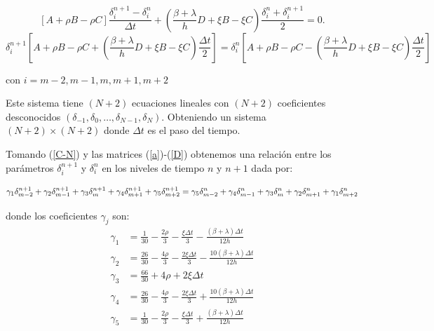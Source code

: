 $$[A+\rho B - \rho C]\frac{\delta_{i}^{n+1}-\delta_{i}^{n}}{\Delta t}+(\frac{\beta+\lambda}{h}D+\xi B-\xi C)\frac{\delta_{i}^{n}+\delta_{i}^{n+1}}{2}=0.$$
\begin{equation}
\label{C-N}
    \delta^{n+1}_{i}[A+\rho B - \rho C+(\frac{\beta+\lambda}{h}D+\xi B -\xi C)\frac{\Delta t}{2}]=\delta^{n}_{i}[A+\rho B - \rho C-(\frac{\beta+\lambda}{h}D+\xi B - \xi C)\frac{\Delta t}{2}]
\end{equation}

\noindent con $i=m-2,m-1,m,m+1,m+2$

Este sistema tiene $(N+2)$ ecuaciones lineales con $(N+2)$ coeficientes desconocidos $(\delta_{-1},\delta_{0},\dots,\delta_{N-1},\delta_{N})$. 
Obteniendo un sistema $(N+2)\times (N+2)$ donde $\Delta t$ es el paso del tiempo.

Tomando (\ref{C-N}) y las matrices (\ref{a})-(\ref{D}) obtenemos una relación entre los parámetros $\delta_{i}^{n+1}$ y $\delta_{i}^{n}$ en los niveles de tiempo $n$ y $n+1$ dada por:

\begin{equation}
\label{gammaec}
   \small{\gamma_{1}\delta_{m-2}^{n+1}+\gamma_{2}\delta_{m-1}^{n+1}+\gamma_{3}\delta_{m}^{n+1}+\gamma_{4}\delta_{m+1}^{n+1}+\gamma_{5}\delta_{m+2}^{n+1}=\\
   \centering
   \gamma_{5}\delta_{m-2}^{n}+\gamma_{4}\delta_{m-1}^{n}+\gamma_{3}\delta_{m}^{n}+\gamma_{2}\delta_{m+1}^{n}+\gamma_{1}\delta_{m+2}^{n}}
\end{equation}


\noindent donde los coeficientes $\gamma_{j}$ son:
\begin{align*}
   \gamma_{1} &=\frac{1}{30}-\frac{2\rho}{3}-\frac{\xi \Delta t}{3}-\frac{(\beta+\lambda)\Delta t}{12h}\\
    \gamma_{2} &=\frac{26}{30}-\frac{4\rho}{3}-\frac{2 \xi \Delta t}{3}-\frac{10(\beta+\lambda)\Delta t}{12h}\\
    \gamma_{3} &=\frac{66}{30}+4\rho+2\xi \Delta t \\
    \gamma_{4} &=\frac{26}{30}-\frac{4\rho}{3}-\frac{2\xi \Delta t}{3}+\frac{10(\beta+\lambda)\Delta t}{12h}\\
    \gamma_{5} &=\frac{1}{30}-\frac{2\rho}{3}-\frac{\xi \Delta t}{3}+\frac{(\beta+\lambda)\Delta t}{12h} 
\end{align*}



